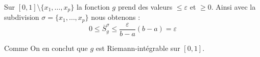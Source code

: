 {\begin{enumerate}
{Sur $[0,1]\setminus \{x_1,\ldots,x_p\}$ la fonction $g$ prend des valeurs
$\le \varepsilon$ et $\ge 0$. Ainsi avec la subdivision
$\sigma = \{x_1,\ldots,x_p\}$ nous obtenons :
\begin{equation*}
 0 \leq \overline{S}_{g}^{\sigma} \leq \frac{\varepsilon}{b-a} (b-a) = \varepsilon
\end{equation*}


Comme On en conclut que $g$ est Riemann-int\'egrable sur $[0,1]$.}
\end{enumerate}
}